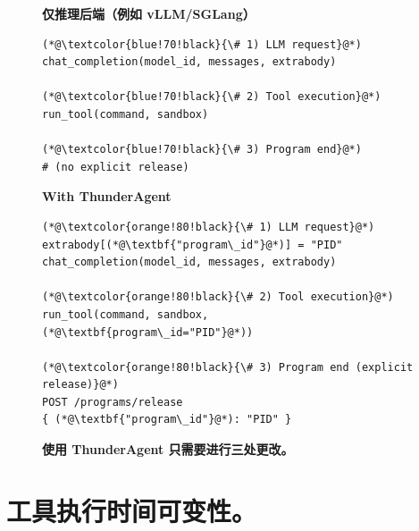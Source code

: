 \begin{figure}[!htbp]
\centering

\begin{minipage}[t]{0.485\linewidth}
\centering
\textbf{仅推理后端（例如 vLLM/SGLang）}\\[-2pt]
\begin{tcolorbox}[
  colback=black!3,
  colframe=black!35,
  boxrule=0.4pt,
  arc=1.2pt,
  left=4pt,right=4pt,top=3pt,bottom=3pt
]
\begin{lstlisting}[style=req]
(*@\textcolor{blue!70!black}{\# 1) LLM request}@*)
chat_completion(model_id, messages, extrabody)

(*@\textcolor{blue!70!black}{\# 2) Tool execution}@*)
run_tool(command, sandbox)

(*@\textcolor{blue!70!black}{\# 3) Program end}@*)
# (no explicit release)
\end{lstlisting}
\end{tcolorbox}
\end{minipage}
\hfill
\begin{minipage}[t]{0.485\linewidth}
\centering
\textbf{With ThunderAgent}\\[-2pt]
\begin{tcolorbox}[
  colback=black!3,
  colframe=black!35,
  boxrule=0.4pt,
  arc=1.2pt,
  left=4pt,right=4pt,top=3pt,bottom=3pt
]
\begin{lstlisting}[style=req]
(*@\textcolor{orange!80!black}{\# 1) LLM request}@*)
extrabody[(*@\textbf{"program\_id"}@*)] = "PID"
chat_completion(model_id, messages, extrabody)

(*@\textcolor{orange!80!black}{\# 2) Tool execution}@*)
run_tool(command, sandbox, (*@\textbf{program\_id="PID"}@*))

(*@\textcolor{orange!80!black}{\# 3) Program end (explicit release)}@*)
POST /programs/release
{ (*@\textbf{"program\_id"}@*): "PID" }
\end{lstlisting}
\end{tcolorbox}
\end{minipage}

\caption{\textbf{使用 ThunderAgent 只需要进行三处更改。}}
\label{fig:router-minimal-changes}
\end{figure}






\newpage
\section{工具执行时间可变性。}
\label{app:tool_var}

